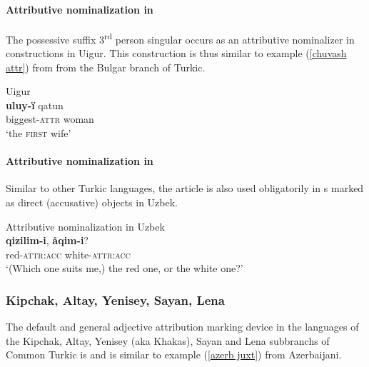 \paragraph*{Attributive nominalization in } 
The possessive suffix 3\textsuperscript{rd} person singular occurs as an attributive nominalizer in  constructions in Uigur. This construction is thus similar to example (\ref{chuvash attr}) from  from the Bulgar branch of Turkic.
\begin{exe}
\ex 
{\rm Uigur \citep[17–18, Footnote 58]{benzing1993b}}\\
\gll	\textbf{uluy-ï} qatun\\
	biggest-\textsc{attr} woman\\
\glt	‘the \textsc{first} wife’
\end{exe}

\paragraph*{Attributive nominalization in }
Similar to other Turkic languages, the article is also used obligatorily in s marked as direct (accusative) objects in Uzbek. 
\begin{exe}
\ex 
\label{uzbek headless acc}	
{\rm Attributive nominalization in Uzbek \citep[371]{boeschoten1998}}\\
 \textbf{qizilim-i}, \textbf{åqim-i}?\\
 	{ } red-\textsc{attr:acc} white-\textsc{attr:acc}\\
\glt 	‘(Which one suits me,) the red one, or the white one?’
\end{exe}

\subsubsection{Kipchak, Altay, Yenisey, Sayan, Lena}
The default and general adjective attribution marking device in the languages of the Kipchak, Altay, Yenisey (aka Khakas), Sayan and Lena subbranchs of Common Turkic is \textbf{} and is similar to example (\ref{azerb juxt}) from Azerbaijani.

